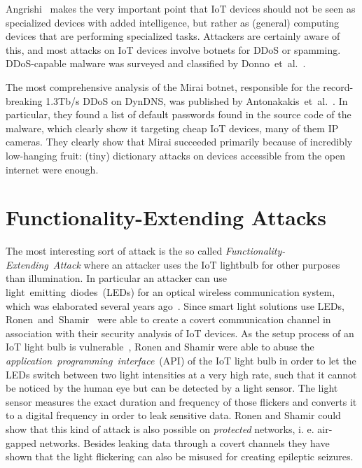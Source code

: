 \documentclass[11pt,a4paper]{article}
\begin{document}
	Angrishi~\cite{Angrishi:2017:TitiiiviIb} %
	makes the very important point that IoT devices should not be seen as specialized devices with added intelligence, but rather as (general) computing devices that are performing specialized tasks.
	Attackers are certainly aware of this, and most attacks on IoT devices involve botnets for DDoS or spamming. DDoS-capable malware was surveyed and classified by Donno~et~al.~\cite{Donno:2017:ADIM}.

	The most comprehensive analysis of the Mirai botnet, responsible for the record-breaking 1.3Tb/s DDoS on DynDNS, was published by
	Antonakakis~et~al.~\cite{Antonakakis:2017:UMB}. %
	In particular, they found a list of default passwords found in the source code of the malware, which clearly show it targeting cheap IoT devices, many of them IP cameras.
	They clearly show that Mirai succeeded primarily because of incredibly low-hanging fruit: (tiny) dictionary attacks on devices accessible from the open internet were enough.


	\section{Functionality-Extending Attacks}%
	\label{sec:functionality_extending_attacks}
	The most interesting sort of attack is the so called \textit{Functionality-Extending~Attack} where an attacker uses the IoT lightbulb for other purposes than illumination. In particular an attacker can use light~emitting~diodes~(LEDs) for an optical wireless communication system, which was elaborated several years ago~\cite{Komine:2004:FAfVLCSuLL, Elgala:2007:OVLWCBoWL}. Since smart light solutions use LEDs, Ronen~and~Shamir~\cite{Ronen:2016:EFAIDCSL} were able to create a covert communication channel in association with their security analysis of IoT devices. As the setup process of an IoT light bulb is vulnerable~\cite{Dhanjani:2013:HLSEPHPWLS, Morgner:2016:AYBBUICSSCLS, Ronen:2018:IGNCZCR}, Ronen and Shamir were able to abuse the \textit{application~programming~interface}~(API) of the IoT light bulb in order to let the LEDs switch between two light intensities at a very high rate, such that it cannot be noticed by the human eye but can be detected by a light sensor. The light sensor measures the exact duration and frequency of those flickers and converts it to a digital frequency in order to leak sensitive data. Ronen and Shamir could show that this kind of attack is also possible on \textit{protected} networks, i. e. air-gapped networks. Besides leaking data through a covert channels they have shown that the light flickering can also be misused for creating epileptic seizures.

	\newpage

	
	
\end{document}
